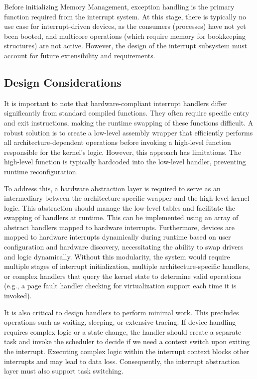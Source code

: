\documentclass[a4paper,10pt,twoside]{report}
\theoremstyle{definition}
\begin{document}
Before initializing Memory Management, exception handling is the primary function required from the interrupt system. At this stage, there is typically no use case for interrupt-driven devices, as the consumers (processes) have not yet been booted, and multicore operations (which require memory for bookkeeping structures) are not active. However, the design of the interrupt subsystem must account for future extensibility and requirements.

\subsection{Design Considerations}

It is important to note that hardware-compliant interrupt handlers differ significantly from standard compiled functions. They often require specific entry and exit instructions, making the runtime swapping of these functions difficult. A robust solution is to create a low-level assembly wrapper that efficiently performs all architecture-dependent operations before invoking a high-level function responsible for the kernel's logic. However, this approach has limitations. The high-level function is typically hardcoded into the low-level handler, preventing runtime reconfiguration.

To address this, a hardware abstraction layer is required to serve as an intermediary between the architecture-specific wrapper and the high-level kernel logic. This abstraction should manage the low-level tables and facilitate the swapping of handlers at runtime. This can be implemented using an array of abstract handlers mapped to hardware interrupts. Furthermore, devices are mapped to hardware interrupts dynamically during runtime based on user configuration and hardware discovery, necessitating the ability to swap drivers and logic dynamically. Without this modularity, the system would require multiple stages of interrupt initialization, multiple architecture-specific handlers, or complex handlers that query the kernel state to determine valid operations (e.g., a page fault handler checking for virtualization support each time it is invoked).

It is also critical to design handlers to perform minimal work. This precludes operations such as waiting, sleeping, or extensive tracing. If device handling requires complex logic or a state change, the handler should create a separate task and invoke the scheduler to decide if we need a context switch upon exiting the interrupt. Executing complex logic within the interrupt context blocks other interrupts and may lead to data loss. Consequently, the interrupt abstraction layer must also support task switching.
\end{document}
